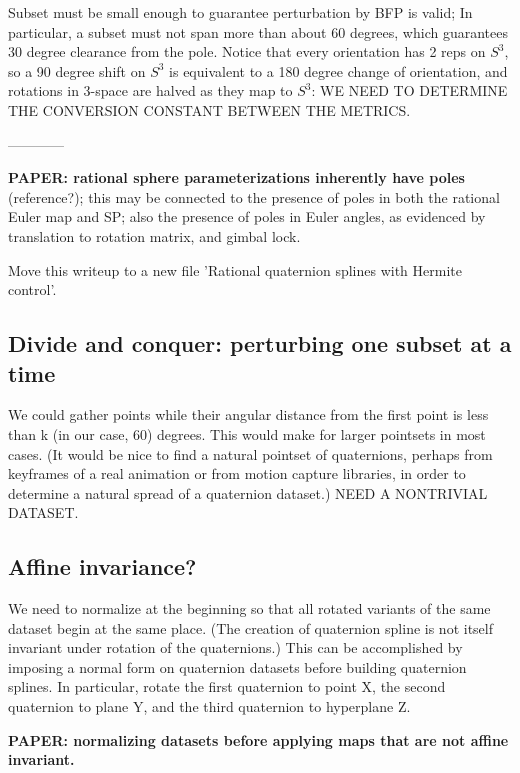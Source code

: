 \documentclass[12pt]{article}
\begin{document}
Subset must be small enough to guarantee perturbation by BFP is valid;
In particular, a subset must not span more than about 60 degrees, which guarantees
30 degree clearance from the pole.
Notice that every orientation has 2 reps on $S^3$, so a 90 degree shift on $S^3$
is equivalent to a 180 degree change of orientation, and rotations in 3-space are halved
as they map to $S^3$: WE NEED TO DETERMINE THE CONVERSION CONSTANT BETWEEN THE METRICS.

------------

{\bf PAPER: rational sphere parameterizations inherently have poles} (reference?);
this may be connected to the presence of poles in 
both the rational Euler map and SP; also the presence of poles in Euler angles,
as evidenced by translation to rotation matrix, and gimbal lock.

Move this writeup to a new file 'Rational quaternion splines with Hermite control'.

\subsection{Divide and conquer: perturbing one subset at a time}

We could gather points while their angular distance from the first point is less
than k (in our case, 60) degrees.
This would make for larger pointsets in most cases.
(It would be nice to find a natural pointset of quaternions, perhaps from keyframes
of a real animation or from motion capture libraries, in order to determine a
natural spread of a quaternion dataset.)
NEED A NONTRIVIAL DATASET.

\subsection{Affine invariance?}
\label{sec:normalform}

We need to normalize at the beginning so that all rotated variants of the same dataset
begin at the same place.
(The creation of quaternion spline is not itself invariant under rotation of the
quaternions.)
This can be accomplished by imposing a normal form on quaternion datasets
before building quaternion splines.
In particular, rotate the first quaternion to point X, the second quaternion to plane Y,
and the third quaternion to hyperplane Z.

{\bf PAPER: normalizing datasets before applying maps that are not affine invariant.}
\end{document}
